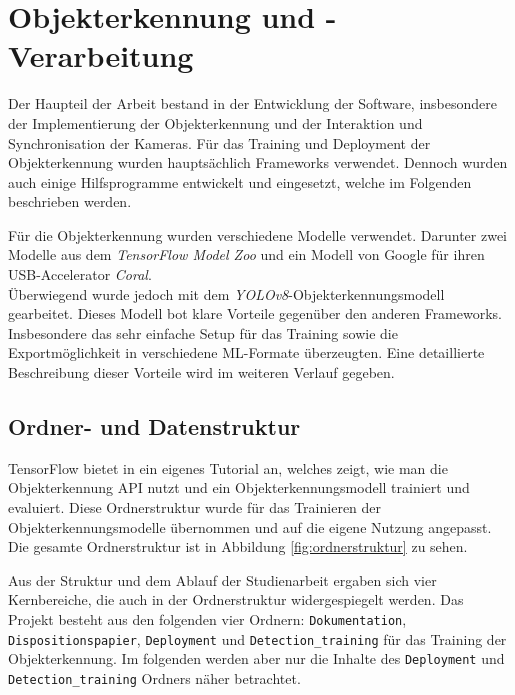 


\section{Objekterkennung und -Verarbeitung}

Der Haupteil der Arbeit bestand in der Entwicklung der Software, insbesondere der Implementierung der Objekterkennung und der Interaktion und Synchronisation der Kameras. Für das Training und Deployment der Objekterkennung wurden hauptsächlich Frameworks verwendet. Dennoch wurden auch einige Hilfsprogramme entwickelt und eingesetzt, welche im Folgenden beschrieben werden.

Für die Objekterkennung wurden verschiedene Modelle verwendet. Darunter zwei Modelle aus dem \textit{TensorFlow Model Zoo} und ein Modell von Google für ihren USB-Accelerator \textit{Coral}.
\\
Überwiegend wurde jedoch mit dem \textit{\ac{YOLO}v8}-Objekterkennungsmodell gearbeitet. Dieses Modell bot klare Vorteile gegenüber den anderen Frameworks. Insbesondere das sehr einfache Setup für das Training sowie die Exportmöglichkeit in verschiedene \ac{ML}-Formate überzeugten. Eine detaillierte Beschreibung dieser Vorteile wird im weiteren Verlauf gegeben.

\subsection{Ordner- und Datenstruktur} \label{cap:struktur}

TensorFlow bietet in \cite{tf2_object_detection_tut} ein eigenes Tutorial an, welches zeigt, wie man die Objekterkennung API nutzt und ein Objekterkennungsmodell trainiert und evaluiert. Diese Ordnerstruktur wurde für das Trainieren der Objekterkennungsmodelle übernommen und auf die eigene Nutzung angepasst. Die gesamte Ordnerstruktur ist in Abbildung \ref{fig:ordnerstruktur} zu sehen.

Aus der Struktur und dem Ablauf der Studienarbeit ergaben sich vier Kernbereiche, die auch in der Ordnerstruktur widergespiegelt werden. Das Projekt besteht aus den folgenden vier Ordnern: \verb|Dokumentation|, \verb|Dispositionspapier|, \verb|Deployment| und \verb|Detection_training| für das Training der Objekterkennung. Im folgenden werden aber nur die Inhalte des \verb|Deployment| und \verb|Detection_training| Ordners näher betrachtet.


